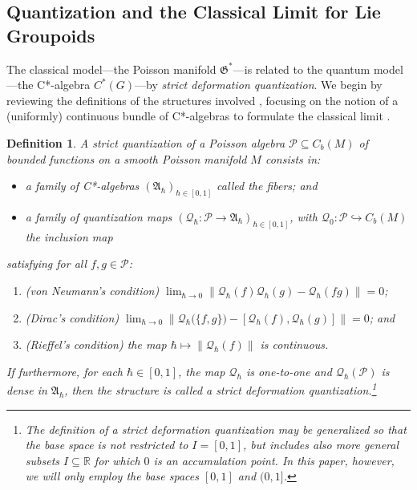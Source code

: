 \documentclass[sn-mathphys,Numbered]{sn-jnl}
\newtheorem{definition}{Definition}%
\providecommand{\norm}[1]{\lVert#1\rVert}
\begin{document}
\subsection{Quantization and the Classical Limit for Lie Groupoids}

The classical model---the Poisson manifold $\mathfrak{G}^*$---is related to the quantum model---the C*-algebra $C^*(G)$---by \emph{strict deformation quantization}.  We begin by reviewing the definitions of the structures involved \citep{Ri89,Ri93,La98b,La06}, focusing on the notion of a (uniformly) continuous bundle of C*-algebras to formulate the classical limit \citep{KiWa95,StFe21,StFe21a}.\bigskip

\begin{definition}
    A \emph{strict quantization} of a Poisson algebra $\mathcal{P}\subseteq C_b(M)$ of bounded functions on a smooth Poisson manifold $M$ consists in:
    \begin{itemize}
        \item a family of C*-algebras $(\mathfrak{A}_\hbar)_{\hbar\in [0,1]}$ called the \emph{fibers}; and
        \item a family of \emph{quantization maps} $(\mathcal{Q}_\hbar: \mathcal{P}\to \mathfrak{A}_\hbar)_{\hbar\in [0,1]}$, with $\mathcal{Q}_0: \mathcal{P}\hookrightarrow C_b(M)$ the inclusion map
    \end{itemize}
    satisfying for all $f,g\in \mathcal{P}$:
    \begin{enumerate}
        \item (von Neumann's condition) $\lim_{\hbar\to 0}\norm{\mathcal{Q}_\hbar(f)\mathcal{Q}_\hbar(g) - \mathcal{Q}_\hbar(fg)} = 0$;
        \item (Dirac's condition) $\lim_{\hbar\to 0}\norm{\mathcal{Q}_\hbar\big(\{f,g\}\big) - [\mathcal{Q}_\hbar(f),\mathcal{Q}_\hbar(g)]} = 0$; and
        \item (Rieffel's condition) the map $\hbar\mapsto \norm{\mathcal{Q}_\hbar(f)}$ is continuous.
    \end{enumerate}
If furthermore, for each $\hbar\in [0,1]$, the map $\mathcal{Q}_\hbar$ is one-to-one and $\mathcal{Q}_\hbar(\mathcal{P})$ is dense in $\mathfrak{A}_\hbar$, then the structure is called a strict \emph{deformation} quantization.\footnote{The definition of a strict deformation quantization may be generalized so that the base space is not restricted to $I=[0,1]$, but includes also more general subsets $I\subseteq \mathbb{R}$ for which $0$ is an accumulation point.  In this paper, however, we will only employ the base spaces $[0,1]$ and $(0,1]$.}
\end{definition}\bigskip
\end{document}
